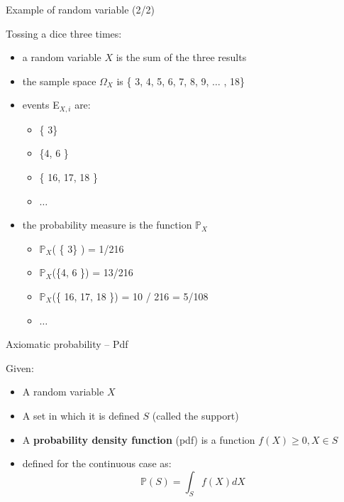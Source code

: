 \documentclass{beamer}
\begin{document}
\begin{frame}
{\centerline{Example of random variable (2/2)}}

Tossing a dice three times:
\begin{itemize}
\item a random variable $X$ is the sum of the three results
\item the sample space $\Omega_X$ is \{ 3, 4, 5, 6, 7, 8, 9, $\ldots{}$ , 18\}
\item events E$_{X,i}$ are: 
\begin{itemize}
\item \{ 3\} 
\item \{4, 6 \} 
\item \{ 16, 17, 18 \}
\item $\ldots{}$
\end{itemize}
\item the probability measure is the function $\mathbb{P}_{X}$
\begin{itemize}
\item $\mathbb{P}_{X}$( \{ 3\} ) = 1/216
\item  $\mathbb{P}_{X}$(\{4, 6 \}) = 13/216
\item  $\mathbb{P}_{X}$(\{ 16, 17, 18 \}) = 10 / 216 = 5/108
\item $\ldots{}$
\end{itemize}
\end{itemize}


\end{frame}




\begin{frame}
{\centerline{Axiomatic probability -- Pdf}}
Given:
\begin{itemize}
\item A random variable $X$
\item A set in which it is defined $S$ (called the support)
\item A \textbf{probability density function} (pdf) is a function $f(X) \geq 0, X \in S$
\item defined for the continuous case as:
$$\mathbb{P}(S) = \int_S f(X)dX $$
\end{itemize}

\end{frame}

\end{document}
